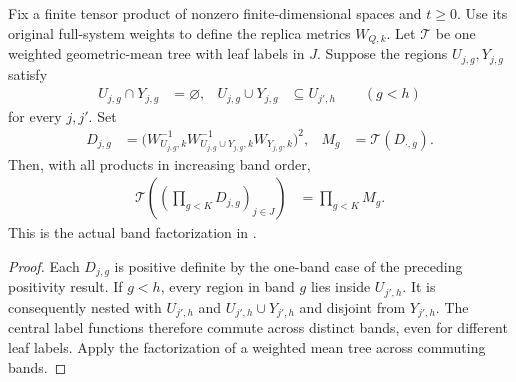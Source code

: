 \begin{theorem}

    \label{thm:replica_pinned_tree_band_product}
    \leanok
    Fix a finite tensor product of nonzero finite-dimensional spaces and
    $t\ge0$. Use its original full-system weights to define the replica
    metrics $W_{Q,k}$. Let $\mathcal T$ be one weighted geometric-mean tree
    with leaf labels in $J$. Suppose the regions $U_{j,g},Y_{j,g}$ satisfy
    \begin{align*}
        U_{j,g}\cap Y_{j,g}&=\varnothing, &
        U_{j,g}\cup Y_{j,g}&\subseteq U_{j',h}
        \qquad(g<h)
    \end{align*}
    for every $j,j'$. Set
    \begin{align*}
        D_{j,g}
        &=\bigl(W_{U_{j,g},k}^{-1}
          W_{U_{j,g}\cup Y_{j,g},k}^{-1}W_{Y_{j,g},k}\bigr)^2,
        & M_g&=\mathcal T(D_{\cdot,g}).
    \end{align*}
    Then, with all products in increasing band order,
    \begin{align*}
        \mathcal T\left(\left(\prod_{g<K}D_{j,g}\right)_{j\in J}\right)
        &=\prod_{g<K}M_g.
    \end{align*}
    This is the actual band factorization in
    \cite[\texttt{06-transport.tex}, Lemma~7.1;
    \texttt{07-comparators.tex}, lines 367--375]{OpenAI2026AreaLaw}.
\end{theorem}
\begin{proof}
    \leanok

    Each $D_{j,g}$ is positive definite by the one-band case of the
    preceding positivity result. If $g<h$, every region in band $g$
    lies inside $U_{j',h}$. It is consequently nested with $U_{j',h}$
    and $U_{j',h}\cup Y_{j',h}$ and disjoint from $Y_{j',h}$.
    The central label functions therefore commute across distinct bands,
    even for different leaf labels. Apply the factorization of
    a weighted mean tree across commuting bands.
\end{proof}


